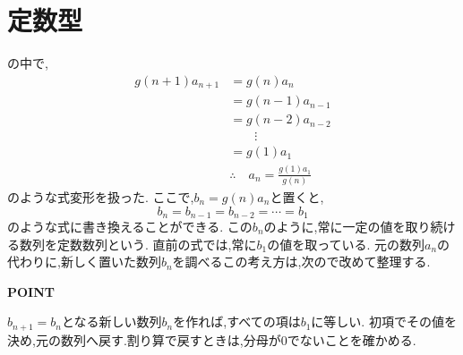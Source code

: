 
\section{定数型}\label{節：定数型}
  の中で,
  \begin{align*}
    g(n+1)a_{n+1}&=g(n)a_n\\
    &=g(n-1)a_{n-1}\\
    &=g(n-2)a_{n-2}\\
    &\qquad \vdots\\
    &=g(1)a_1\\
    &\therefore \quad a_n=\frac{g(1)a_1}{g(n)}
  \end{align*}
  のような式変形を扱った.
  ここで,$b_n=g(n)a_n$と置くと,
  \[
    b_n=b_{n-1}=b_{n-2}=\cdots=b_1
  \]
  のような式に書き換えることができる.
  この$b_n$のように,常に一定の値を取り続ける数列を定数数列という.
  直前の式では,常に$b_1$の値を取っている.
  元の数列$a_n$の代わりに,新しく置いた数列$b_n$を調べるこの考え方は,次ので改めて整理する.

  \begin{bookpoint}
    \textbf{POINT}\par
    $b_{n+1}=b_n$となる新しい数列$b_n$を作れば,すべての項は$b_1$に等しい.
    初項でその値を決め,元の数列へ戻す.割り算で戻すときは,分母が0でないことを確かめる.
  \end{bookpoint}
  
